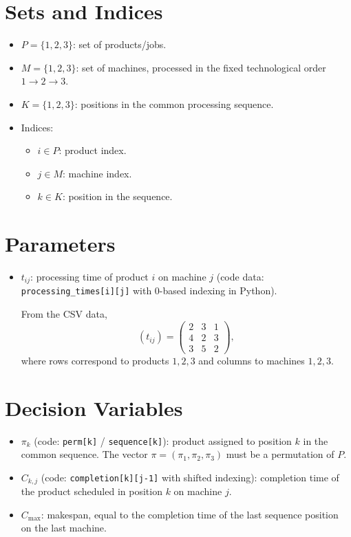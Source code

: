 \section*{Sets and Indices}

\begin{itemize}
    \item $P = \{1,2,3\}$: set of products/jobs.
    \item $M = \{1,2,3\}$: set of machines, processed in the fixed technological order $1 \rightarrow 2 \rightarrow 3$.
    \item $K = \{1,2,3\}$: positions in the common processing sequence.
    \item Indices:
    \begin{itemize}
        \item $i \in P$: product index.
        \item $j \in M$: machine index.
        \item $k \in K$: position in the sequence.
    \end{itemize}
\end{itemize}

\section*{Parameters}

\begin{itemize}
    \item $t_{ij}$: processing time of product $i$ on machine $j$ (code data: \texttt{processing\_times[i][j]} with $0$-based indexing in Python).
    
    From the CSV data,
    \[
    (t_{ij}) =
    \begin{pmatrix}
    2 & 3 & 1\\
    4 & 2 & 3\\
    3 & 5 & 2
    \end{pmatrix},
    \]
    where rows correspond to products $1,2,3$ and columns to machines $1,2,3$.
\end{itemize}

\section*{Decision Variables}

\begin{itemize}
    \item $\pi_k$ (code: \texttt{perm[k]} / \texttt{sequence[k]}): product assigned to position $k$ in the common sequence. The vector $\pi=(\pi_1,\pi_2,\pi_3)$ must be a permutation of $P$.
    \item $C_{k,j}$ (code: \texttt{completion[k][j-1]} with shifted indexing): completion time of the product scheduled in position $k$ on machine $j$.
    \item $C_{\max}$: makespan, equal to the completion time of the last sequence position on the last machine.
\end{itemize}


